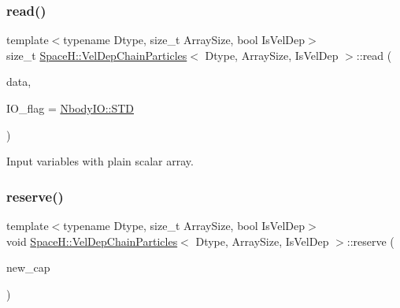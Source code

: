\subsubsection{\texorpdfstring{read()}{read()}\hspace{0.1cm}{\footnotesize\ttfamily [2/2]}}
{\footnotesize\ttfamily template$<$typename Dtype, size\+\_\+t Array\+Size, bool Is\+Vel\+Dep$>$ \\
size\+\_\+t \mbox{\hyperlink{class_space_h_1_1_vel_dep_chain_particles}{Space\+H\+::\+Vel\+Dep\+Chain\+Particles}}$<$ Dtype, Array\+Size, Is\+Vel\+Dep $>$\+::read (\begin{DoxyParamCaption}\item[{const \mbox{\hyperlink{class_space_h_1_1_vel_indep_particles_abca40159a816385790d5a6fd19c1dc6d}{Scalar\+Buffer}} \&}]{data,  }\item[{const \mbox{\hyperlink{namespace_space_h_a296a8bae763a754564bfdce216e31b59}{Nbody\+IO}}}]{I\+O\+\_\+flag = {\ttfamily \mbox{\hyperlink{namespace_space_h_a296a8bae763a754564bfdce216e31b59ac6ce23be5d350ce18a665427d2d950f7}{Nbody\+I\+O\+::\+S\+TD}}} }\end{DoxyParamCaption})\hspace{0.3cm}{\ttfamily [inline]}}



Input variables with plain scalar array. 

\mbox{\label{class_space_h_1_1_vel_dep_chain_particles_a0257a89d0e3058624cc076c2956b94ea}} 
\subsubsection{\texorpdfstring{reserve()}{reserve()}\hspace{0.1cm}{\footnotesize\ttfamily [1/2]}}
{\footnotesize\ttfamily template$<$typename Dtype, size\+\_\+t Array\+Size, bool Is\+Vel\+Dep$>$ \\
void \mbox{\hyperlink{class_space_h_1_1_vel_dep_chain_particles}{Space\+H\+::\+Vel\+Dep\+Chain\+Particles}}$<$ Dtype, Array\+Size, Is\+Vel\+Dep $>$\+::reserve (\begin{DoxyParamCaption}\item[{size\+\_\+t}]{new\+\_\+cap }\end{DoxyParamCaption})\hspace{0.3cm}{\ttfamily [inline]}}



